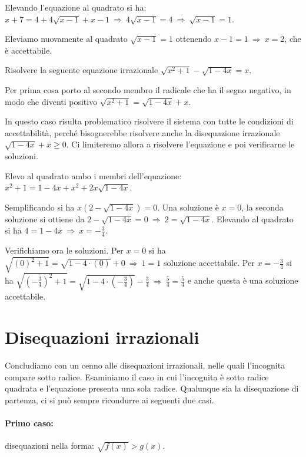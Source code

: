 \begin{exrig}
\begin{esempio}
Elevando l'equazione al quadrato si ha: $x+7=4+4\sqrt{x-1}+x-1 \:\Rightarrow\: 4\sqrt{x-1}=4 \:\Rightarrow\: \sqrt{x-1}=1$.

Eleviamo nuovamente al quadrato $\sqrt{x-1}=1$ ottenendo $x-1=1\:\Rightarrow\: x=2$, che è accettabile.
\end{esempio}

\begin{esempio}
Risolvere la seguente equazione irrazionale $\sqrt{x^2+1}-\sqrt{1-4x}=x$.

Per prima cosa porto al secondo membro il radicale che ha il segno negativo, in modo che diventi positivo $\sqrt{x^2+1}=\sqrt{1-4x}+x$.

In questo caso risulta problematico risolvere il sistema con tutte le condizioni di accettabilità, perché bisognerebbe risolvere anche la disequazione irrazionale $\sqrt{1-4x}+x\ge 0$.
Ci limiteremo allora a risolvere l'equazione e poi verificarne le soluzioni.

Elevo al quadrato ambo i membri dell'equazione: $x^2+1=1-4x+x^2+2x\sqrt{1-4x}$.

Semplificando si ha $x(2-\sqrt{1-4x})=0$. Una soluzione è $x=0$, la seconda soluzione si ottiene da $2-\sqrt{1-4x}=0\:\Rightarrow\: 2=\sqrt{1-4x}$. Elevando al quadrato si ha $4=1-4x\:\Rightarrow\: x=-\frac 3 4$.

Verifichiamo ora le soluzioni. Per $x=0$ si ha $\sqrt{(0)^2+1}=\sqrt{1-4\cdot (0)}+0\:\Rightarrow\: 1=1$ soluzione accettabile. Per $x=-\frac 3 4$ si ha $\sqrt{\left(-\frac 3 4\right)^2+1}=\sqrt{1-4\cdot\left(-\frac 3 4\right)}-\frac 3 4\:\Rightarrow\:\frac 5 4=\frac 5 4$ e anche questa è una soluzione accettabile.
\end{esempio}
\end{exrig}
\ovalbox{\risolvii \ref{ese:8.10}, \ref{ese:8.11}, \ref{ese:8.12}, \ref{ese:8.13}, \ref{ese:8.14}, \ref{ese:8.15}, \ref{ese:8.16}, \ref{ese:8.17}}

\section{Disequazioni irrazionali}

Concludiamo con un cenno alle disequazioni irrazionali, nelle quali l'incognita compare sotto radice. Esaminiamo il caso in cui l'incognita è sotto radice quadrata e l'equazione presenta una sola radice. Qualunque sia la disequazione di partenza, ci si può sempre ricondurre ai seguenti due casi.

\paragraph{Primo caso:} disequazioni nella forma: $\sqrt{f(x)}>g(x)$.

